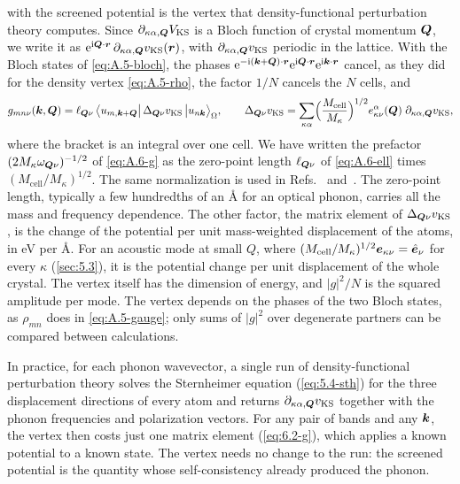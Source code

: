  with the screened potential is the vertex that density-functional perturbation theory computes. Since $\partial_{\kappa\alpha,\bm{Q}}V_{\mathrm{KS}}$ is a Bloch function of crystal momentum $\bm{Q}$, we write it as $\mathrm{e}^{\mathrm{i}\bm{Q}\cdot\bm{r}}\,\partial_{\kappa\alpha,\bm{Q}}v_{\mathrm{KS}}(\bm{r})$, with $\partial_{\kappa\alpha,\bm{Q}}v_{\mathrm{KS}}$ periodic in the lattice. With the Bloch states of \cref{eq:A.5-bloch}, the phases $\mathrm{e}^{-\mathrm{i}(\bm{k}+\bm{Q})\cdot\bm{r}}\mathrm{e}^{\mathrm{i}\bm{Q}\cdot\bm{r}}\mathrm{e}^{\mathrm{i}\bm{k}\cdot\bm{r}}$ cancel, as they did for the density vertex \cref{eq:A.5-rho}, the factor $1/N$ cancels the $N$ cells, and
\begin{equation}
  g_{mn\nu}(\bm{k},\bm{Q}) = \ell_{\bm{Q}\nu}\,\bigl\langle u_{m,\bm{k}+\bm{Q}}\bigr|\,\Delta_{\bm{Q}\nu}v_{\mathrm{KS}}\,\bigl|u_{n\bm{k}}\bigr\rangle_\Omega ,
  \qquad
  \Delta_{\bm{Q}\nu}v_{\mathrm{KS}} = \sum_{\kappa\alpha}\Bigl(\frac{M_{\mathrm{cell}}}{M_\kappa}\Bigr)^{1/2}e^\alpha_{\kappa\nu}(\bm{Q})\;\partial_{\kappa\alpha,\bm{Q}}v_{\mathrm{KS}} ,
  \label{eq:6.2-g}
\end{equation}
where the bracket is an integral over one cell. We have written the prefactor $(2M_\kappa\omega_{\bm{Q}\nu})^{-1/2}$ of \cref{eq:A.6-g} as the zero-point length $\ell_{\bm{Q}\nu}$ of \cref{eq:A.6-ell} times $(M_{\mathrm{cell}}/M_\kappa)^{1/2}$. The same normalization is used in Refs.~\cite[Eqs.~(33)--(38)]{giustino2017electron} and~\cite[Eq.~(2)]{ponce2016epw}. The zero-point length, typically a few hundredths of an \si{\angstrom} for an optical phonon, carries all the mass and frequency dependence. The other factor, the matrix element of $\Delta_{\bm{Q}\nu}v_{\mathrm{KS}}$, is the change of the potential per unit mass-weighted displacement of the atoms, in eV per \si{\angstrom}. For an acoustic mode at small $Q$, where $(M_{\mathrm{cell}}/M_\kappa)^{1/2}\bm{e}_{\kappa\nu} = \hat{\bm{e}}_\nu$ for every $\kappa$ (\cref{sec:5.3}), it is the potential change per unit displacement of the whole crystal. The vertex itself has the dimension of energy, and $|g|^2/N$ is the squared amplitude per mode. The vertex depends on the phases of the two Bloch states, as $\rho_{mn}$ does in \cref{eq:A.5-gauge}; only sums of $|g|^2$ over degenerate partners can be compared between calculations.

In practice, for each phonon wavevector, a single run of density-functional perturbation theory solves the Sternheimer equation (\cref{eq:5.4-sth}) for the three displacement directions of every atom and returns $\partial_{\kappa\alpha,\bm{Q}}v_{\mathrm{KS}}$ together with the phonon frequencies and polarization vectors. For any pair of bands and any $\bm{k}$, the vertex then costs just one matrix element (\cref{eq:6.2-g}), which applies a known potential to a known state. The vertex needs no change to the run: the screened potential is the quantity whose self-consistency already produced the phonon.

